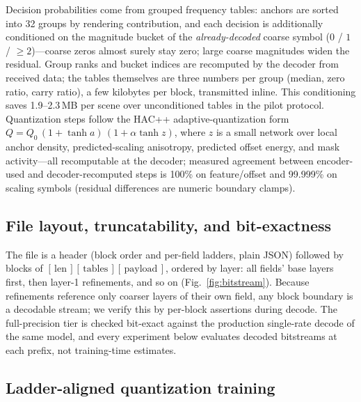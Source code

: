 Decision probabilities come from grouped frequency tables: anchors are sorted into 32 groups by rendering contribution, and each decision is additionally conditioned on the magnitude bucket of the \emph{already-decoded} coarse symbol ($0$ / $1$ / $\ge 2$)---coarse zeros almost surely stay zero; large coarse magnitudes widen the residual.
Group ranks and bucket indices are recomputed by the decoder from received data; the tables themselves are three numbers per group (median, zero ratio, carry ratio), a few kilobytes per block, transmitted inline.
This conditioning saves 1.9--2.3\,MB per scene over unconditioned tables in the pilot protocol.
Quantization steps follow the HAC++ adaptive-quantization form $Q = Q_0\,(1{+}\tanh a)\,(1{+}\alpha\tanh z)$, where $z$ is a small network over local anchor density, predicted-scaling anisotropy, predicted offset energy, and mask activity---all recomputable at the decoder; measured agreement between encoder-used and decoder-recomputed steps is 100\% on feature/offset and 99.999\% on scaling symbols (residual differences are numeric boundary clamps).

\subsection{File layout, truncatability, and bit-exactness}
\label{sec:layout}

The file is a header (block order and per-field ladders, plain JSON) followed by blocks of $[\,\text{len}\,][\,\text{tables}\,][\,\text{payload}\,]$, ordered by layer: all fields' base layers first, then layer-1 refinements, and so on (Fig.~\ref{fig:bitstream}).
Because refinements reference only coarser layers of their own field, any block boundary is a decodable stream; we verify this by per-block assertions during decode.
The full-precision tier is checked bit-exact against the production single-rate decode of the same model, and every experiment below evaluates decoded bitstreams at each prefix, not training-time estimates.

\subsection{Ladder-aligned quantization training}
\label{sec:align}

